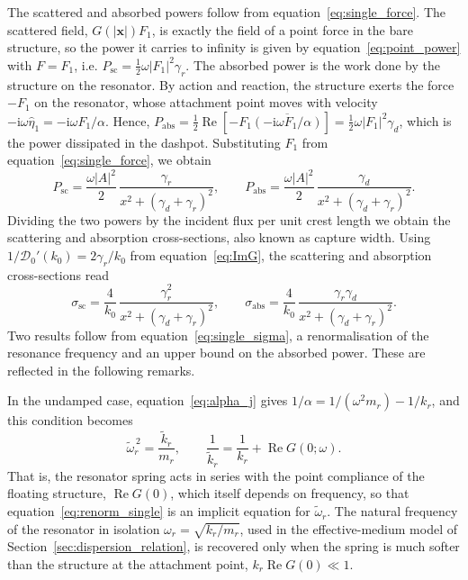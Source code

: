 The scattered and absorbed powers follow from equation~\eqref{eq:single_force}. The scattered field, $G(|\mathbf{x}|)F_1$, is exactly the field of a point force in the bare structure, so the power it carries to infinity is given by equation~\eqref{eq:point_power} with $F=F_1$, i.e. $P_{\mathrm{sc}}=\tfrac12\omega|F_1|^2\gamma_r$. The absorbed power is the work done by the structure on the resonator. By action and reaction, the structure exerts the force $-F_1$ on the resonator, whose attachment point moves with velocity $-\mathrm{i}\omega\widehat{\eta}_1=-\mathrm{i}\omega F_1/\alpha$. Hence, $P_{\mathrm{abs}}=\tfrac12\operatorname{Re}[-F_1\overline{(-\mathrm{i}\omega F_1/\alpha)}]=\tfrac12\omega|F_1|^2\gamma_d$, which is the power dissipated in the dashpot. Substituting $F_1$ from equation~\eqref{eq:single_force}, we obtain
\begin{equation}
  \label{eq:single_powers}
  P_{\mathrm{sc}}=\frac{\omega|A|^2}{2}\,\frac{\gamma_r}{x^2+(\gamma_d+\gamma_r)^2},
  \qquad
  P_{\mathrm{abs}}=\frac{\omega|A|^2}{2}\,\frac{\gamma_d}{x^2+(\gamma_d+\gamma_r)^2}.
\end{equation}
Dividing the two powers by the incident flux per unit crest length we obtain the scattering and absorption cross-sections, also known as capture width. Using $1/\mathcal{D}_0'(k_0)=2\gamma_r/k_0$ from equation~\eqref{eq:ImG}, the scattering and absorption cross-sections read
\begin{equation}
  \label{eq:single_sigma}
  \sigma_{\mathrm{sc}}=\frac{4}{k_0}\,\frac{\gamma_r^2}{x^2+(\gamma_d+\gamma_r)^2},
  \qquad
  \sigma_{\mathrm{abs}}=\frac{4}{k_0}\,\frac{\gamma_r\gamma_d}{x^2+(\gamma_d+\gamma_r)^2}.
\end{equation}
Two results follow from equation~\eqref{eq:single_sigma}, a renormalisation of the resonance frequency and an upper bound on the absorbed power. These are reflected in the following remarks.

\begin{remark} In the undamped case, equation~\eqref{eq:alpha_j} gives $1/\alpha=1/(\omega^2m_r)-1/k_r$, and this condition becomes
\begin{equation}
  \label{eq:renorm_single}
  \widetilde{\omega}_r^{\,2}=\frac{\widetilde{k}_r}{m_r},
  \qquad
  \frac{1}{\widetilde{k}_r}=\frac{1}{k_r}+\operatorname{Re}G(0;\omega).
\end{equation}
That is, the resonator spring acts in series with the point compliance of the floating structure, $\operatorname{Re}G(0)$, which itself depends on frequency, so that equation~\eqref{eq:renorm_single} is an implicit equation for $\widetilde{\omega}_r$. The natural frequency of the resonator in isolation $\omega_r=\sqrt{k_r/m_r}$, used in the effective-medium model of Section~\ref{sec:dispersion_relation}, is recovered only when the spring is much softer than the structure at the attachment point, $k_r\operatorname{Re}G(0)\ll1$.
\end{remark}

